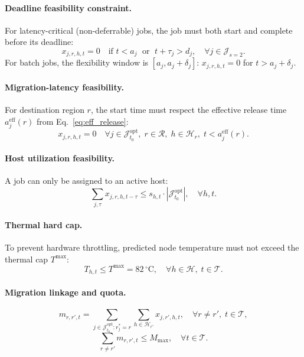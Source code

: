 \documentclass[a4paper,fleqn]{cas-dc}
\begin{document}
\paragraph{Deadline feasibility constraint.}
For latency-critical (non-deferrable) jobs, the job must both start and complete before its deadline:
\begin{equation}
\label{eq:deadline_hard}
x_{j,r,h,t} = 0 \quad \text{if } t < a_j \;\text{ or }\; t + \tau_j > d_j, \quad \forall j \in \mathcal{J}_{s=2}.
\end{equation}
For batch jobs, the flexibility window is $[a_j, a_j + \delta_j]$: $x_{j,r,h,t} = 0$ for $t > a_j + \delta_j$.

\paragraph{Migration-latency feasibility.}
For destination region $r$, the start time must respect the effective release time $a^{\mathrm{eff}}_j(r)$ from Eq.~\eqref{eq:eff_release}:
\begin{equation}
\label{eq:migration_latency}
x_{j,r,h,t} = 0 \quad \forall j \in \mathcal{J}^{\mathrm{opt}}_{t_0},\; r \in \mathcal{R},\; h \in \mathcal{H}_r,\; t < a^{\mathrm{eff}}_j(r).
\end{equation}

\paragraph{Host utilization feasibility.}
A job can only be assigned to an active host:
\begin{equation}
\sum_{j,\tau} x_{j,r,h,t-\tau} \leq s_{h,t} \cdot |\mathcal{J}^{\mathrm{opt}}_{t_0}|, \quad \forall h,t.
\end{equation}

\paragraph{Thermal hard cap.}
To prevent hardware throttling, predicted node temperature must not exceed the thermal cap $T^{\max}$:
\begin{equation}
\label{eq:thermal_cap}
T_{h,t} \leq T^{\max} = 82\,^{\circ}\text{C}, \quad \forall h \in \mathcal{H},\; t \in \mathcal{T}.
\end{equation}

\paragraph{Migration linkage and quota.}
\begin{equation}
\label{eq:migration_link}
m_{r,r',t} = \sum_{j \in \mathcal{J}^{\mathrm{opt}}_{t_0}: r^*_j = r} \sum_{h \in \mathcal{H}_{r'}} x_{j,r',h,t}, \quad \forall r \neq r',\; t \in \mathcal{T},
\end{equation}
\begin{equation}
\label{eq:migration_quota}
\sum_{r \neq r'} m_{r,r',t} \leq M_{\max}, \quad \forall t \in \mathcal{T}.
\end{equation}
\end{document}
